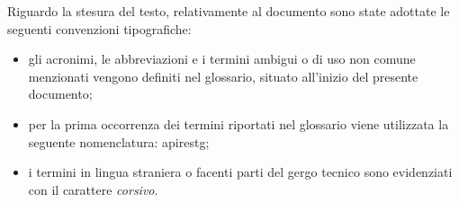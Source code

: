 \noindent Riguardo la stesura del testo, relativamente al documento sono state adottate le seguenti convenzioni tipografiche:
\begin{itemize}
	\item gli acronimi, le abbreviazioni e i termini ambigui o di uso non comune menzionati vengono definiti nel glossario, situato all'inizio del presente documento;
	\item per la prima occorrenza dei termini riportati nel glossario viene utilizzata la seguente nomenclatura: \gls{apirestg};
	\item i termini in lingua straniera o facenti parti del gergo tecnico sono evidenziati con il carattere \textit{corsivo}.
\end{itemize}


\newpage